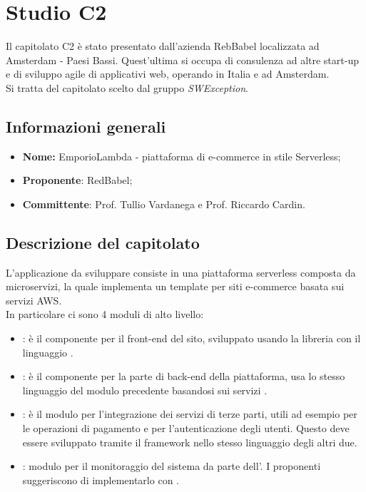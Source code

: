 \section{Studio C2} \label{_c2}
Il capitolato C2 è stato presentato dall'azienda RebBabel localizzata ad Amsterdam - Paesi Bassi. Quest'ultima si occupa di consulenza ad altre start-up e di sviluppo agile di applicativi web, operando in Italia e ad Amsterdam.\\
Si tratta del capitolato scelto dal gruppo \textit{SWException}.

\subsection{Informazioni generali}
\begin{itemize}
	\item \textbf{Nome:} EmporioLambda - piattaforma di e-commerce in stile Serverless;
	\item \textbf{Proponente}: RedBabel;
	\item \textbf{Committente}: Prof. Tullio Vardanega e Prof. Riccardo Cardin.
\end{itemize}

\subsection{Descrizione del capitolato}
L'applicazione da sviluppare consiste in una piattaforma serverless composta da microservizi, la quale implementa un template per siti e-commerce basata sui servizi AWS.\\
In particolare ci sono 4 moduli di alto livello:
\begin{itemize}
	\item {}: è il componente per il front-end del sito, sviluppato usando la libreria \textit{} con il linguaggio \textit{}.
	\item {}: è il componente per la parte di back-end della piattaforma, usa lo stesso linguaggio del modulo precedente basandosi sui servizi \textit{}.
	\item {}: è il modulo per l'integrazione dei servizi di terze parti, utili ad esempio per le operazioni di pagamento e per l'autenticazione degli utenti. Questo deve essere sviluppato tramite il \textit{} framework nello stesso linguaggio degli altri due.
	\item {}: modulo per il monitoraggio del sistema da parte dell'. I proponenti suggeriscono di implementarlo con \textit{}.
\end{itemize}

